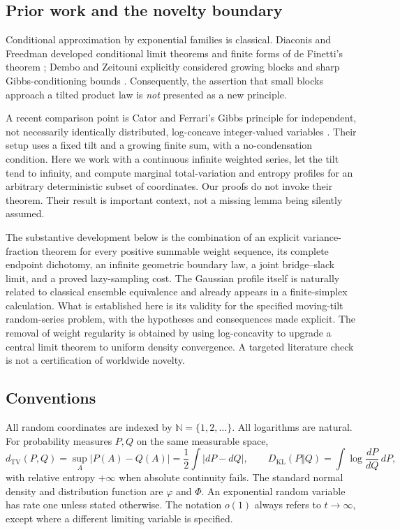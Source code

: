 \documentclass[11pt,a4paper]{article}
\numberwithin{equation}{section}
\theoremstyle{definition}
\theoremstyle{remark}
\newcommand{\N}{\mathbb N}
\newcommand{\TV}{d_{\mathrm{TV}}}
\newcommand{\KL}{D_{\mathrm{KL}}}
\newcommand{\phiN}{\varphi}
\newcommand{\PhiN}{\Phi}
\begin{document}
\subsection{Prior work and the novelty boundary}
Conditional approximation by exponential families is classical.
Diaconis and Freedman developed conditional limit theorems and finite
forms of de Finetti's theorem \cite{diaconisfreedman}; Dembo and Zeitouni
explicitly considered growing blocks and sharp Gibbs-conditioning
bounds \cite{dembozeitouni}. Consequently, the assertion that small
blocks approach a tilted product law is \emph{not} presented as a new
principle.

A recent comparison point is Cator and Ferrari's Gibbs principle for
independent, not necessarily identically distributed, log-concave
integer-valued variables \cite{catorferrari}. Their setup uses a fixed
tilt and a growing finite sum, with a no-condensation condition. Here
we work with a continuous infinite weighted series, let the tilt tend
to infinity, and compute marginal total-variation and entropy profiles
for an arbitrary deterministic subset of coordinates. Our proofs do
not invoke their theorem. Their result is important context, not a
missing lemma being silently assumed.

The substantive development below is the combination of an explicit
variance-fraction theorem for every positive summable weight sequence,
its complete endpoint dichotomy, an
infinite geometric boundary law, a joint bridge--slack limit, and a
proved lazy-sampling cost. The Gaussian profile itself is naturally
related to classical ensemble equivalence and already appears in a
finite-simplex calculation. What is established here is its validity
for the specified moving-tilt random-series problem, with the
hypotheses and consequences made explicit. The removal of weight
regularity is obtained by using log-concavity to upgrade a central
limit theorem to uniform density convergence. A targeted literature
check is not a certification of worldwide novelty.

\subsection{Conventions}
All random coordinates are indexed by $\N=\{1,2,\ldots\}$. All
logarithms are natural. For probability measures $P,Q$ on the same
measurable space,
\[
 \TV(P,Q)=\sup_A|P(A)-Q(A)|
          =\frac12\int|dP-dQ|,
 \qquad
 \KL(P\Vert Q)=\int\log\frac{dP}{dQ}\,dP,
\]
with relative entropy $+\infty$ when absolute continuity fails. The
standard normal density and distribution function are $\phiN$ and
$\PhiN$. An exponential random variable has rate one unless stated
otherwise. The notation $o(1)$ always refers to $t\to\infty$, except
where a different limiting variable is specified.
\end{document}
